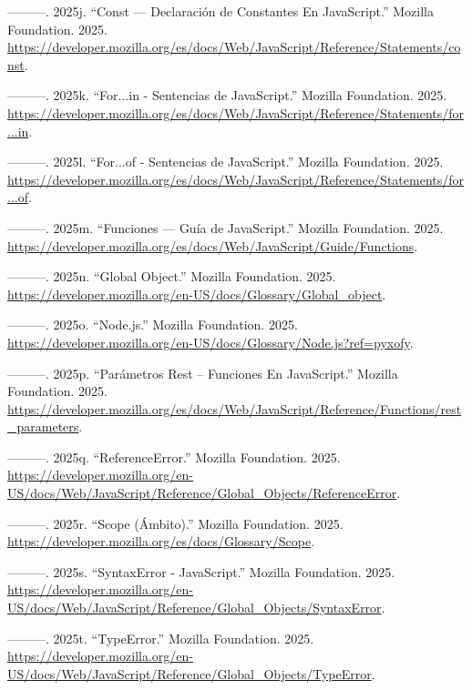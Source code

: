 \documentclass[
  letterpaper,
  DIV=11,
  numbers=noendperiod]{scrreprt}
\newlength{\cslhangindent}
\newenvironment{CSLReferences}[2] %
 {\begin{list}{}{%
  \setlength{\itemindent}{0pt}
  \setlength{\leftmargin}{0pt}
  \setlength{\parsep}{0pt}
  \ifodd #1
   \setlength{\leftmargin}{\cslhangindent}
   \setlength{\itemindent}{-1\cslhangindent}
  \fi
  \setlength{\itemsep}{#2\baselineskip}}}
 {\end{list}}
\begin{document}
\begin{CSLReferences}{1}{0}
---------. 2025j. {``Const --- Declaración de Constantes En
JavaScript.''} Mozilla Foundation. 2025.
\url{https://developer.mozilla.org/es/docs/Web/JavaScript/Reference/Statements/const}.

---------. 2025k. {``For...in - Sentencias de JavaScript.''} Mozilla
Foundation. 2025.
\url{https://developer.mozilla.org/es/docs/Web/JavaScript/Reference/Statements/for...in}.

---------. 2025l. {``For...of - Sentencias de JavaScript.''} Mozilla
Foundation. 2025.
\url{https://developer.mozilla.org/es/docs/Web/JavaScript/Reference/Statements/for...of}.

---------. 2025m. {``Funciones --- Guía de JavaScript.''} Mozilla
Foundation. 2025.
\url{https://developer.mozilla.org/es/docs/Web/JavaScript/Guide/Functions}.

---------. 2025n. {``Global Object.''} Mozilla Foundation. 2025.
\url{https://developer.mozilla.org/en-US/docs/Glossary/Global_object}.

---------. 2025o. {``Node.js.''} Mozilla Foundation. 2025.
\url{https://developer.mozilla.org/en-US/docs/Glossary/Node.js?ref=pyxofy}.

---------. 2025p. {``Parámetros Rest -- Funciones En JavaScript.''}
Mozilla Foundation. 2025.
\url{https://developer.mozilla.org/es/docs/Web/JavaScript/Reference/Functions/rest_parameters}.

---------. 2025q. {``ReferenceError.''} Mozilla Foundation. 2025.
\url{https://developer.mozilla.org/en-US/docs/Web/JavaScript/Reference/Global_Objects/ReferenceError}.

---------. 2025r. {``Scope (Ámbito).''} Mozilla Foundation. 2025.
\url{https://developer.mozilla.org/es/docs/Glossary/Scope}.

---------. 2025s. {``SyntaxError - JavaScript.''} Mozilla Foundation.
2025.
\url{https://developer.mozilla.org/en-US/docs/Web/JavaScript/Reference/Global_Objects/SyntaxError}.

---------. 2025t. {``TypeError.''} Mozilla Foundation. 2025.
\url{https://developer.mozilla.org/en-US/docs/Web/JavaScript/Reference/Global_Objects/TypeError}.


\end{CSLReferences}
\end{document}
